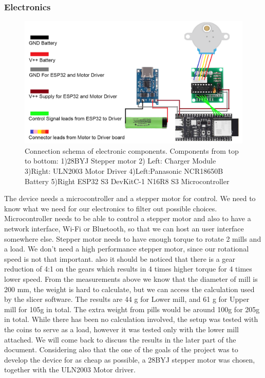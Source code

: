 \subsubsection{Electronics}
\begin{figure}
	\centering
	\includegraphics[width=0.9\linewidth]{Figures/Motor}
	\caption[Connection schema of electronic components]{Connection schema of electronic components. Components from top to bottom: 1)28BYJ Stepper motor 2) Left: Charger Module 3)Right: ULN2003 Motor Driver 4)Left:Panasonic NCR18650B Battery 5)Right ESP32 S3 DevKitC-1 N16R8 S3 Microcontroller}
	\label{fig:motor}
\end{figure}
The device needs a microcontroller and a stepper motor for control. We need to know what we need for our electronics to filter out possible choices. Microcontroller needs to be able to control a stepper motor and also to have a network interface, Wi-Fi or Bluetooth, so that we can host an user interface somewhere else. Stepper motor needs to have enough torque to rotate 2 mills and a load. We don't need a high performance stepper motor, since our rotational speed is not that important. also it should be noticed that there is a gear reduction of 4:1 on the gears which results in 4 times higher torque for 4 times lower speed. From the measurements above we know that the diameter of mill is 200 mm, the weight is hard to calculate, but we can access the calculation used by the slicer software. The results are 44 g for Lower mill, and 61 g for Upper mill for 105g in total. The extra weight from pills would be around 100g for 205g in total. While there has been no calculation involved, the setup was tested with the coins to serve as a load, however it was tested only with the lower mill attached. We will come back to discuss the results in the later part of the document. Considering also that the one of the goals of the project was to develop the device for as cheap as possible, a 28BYJ \cite{stepper} stepper motor was chosen, together with the ULN2003\cite{ti_uln2003a_revT_2025} Motor driver.

